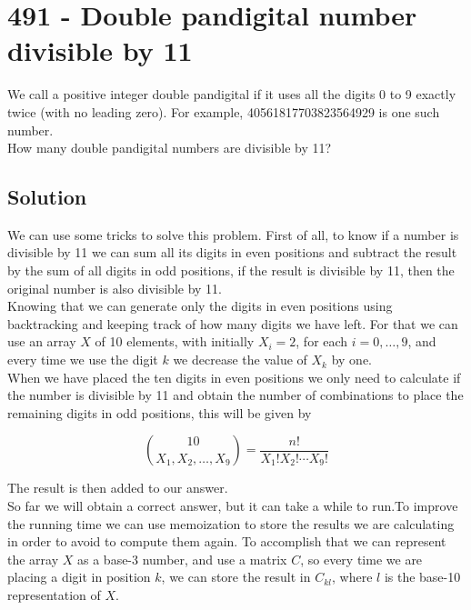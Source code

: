 \chapter*{491 - Double pandigital number divisible by 11}

We call a positive integer double pandigital if it uses all the digits 0 to 9 exactly twice (with no leading zero). For example, 40561817703823564929 is one such number.\\

How many double pandigital numbers are divisible by 11?

\section*{Solution}

We can use some tricks to solve this problem. First of all, to know if a number is divisible by 11 we can sum all its digits in even positions and subtract the result by the sum of all digits in odd positions, if the result is divisible by 11, then the original number is also divisible by 11.\\

Knowing that we can generate only the digits in even positions using backtracking and keeping track of how many digits we have left. For that we can use an array $X$ of 10 elements, with initially $X_i = 2$, for each $i=0, \ldots, 9$, and every time we use the digit $k$ we decrease the value of $X_k$ by one.\\

When we have placed the ten digits in even positions we only need to calculate if the number is divisible by 11 and obtain the number of combinations to place the remaining digits in odd positions, this will be given by

$$
    \binom {10}{X_1,X_2,\ldots,X_9} = \frac{n!}{X_1!X_2!\cdots X_9!}
$$

The result is then added to our answer. \\

So far we will obtain a correct answer, but it can take a while to run.To improve the running time we can use memoization to store the results we are calculating in order to avoid to compute them again. To accomplish that we can represent the array $X$ as a base-3 number, and use a matrix $C$, so every time we are placing a digit in position $k$, we can store the result in $C_{kl}$, where $l$ is the base-10 representation of $X$.